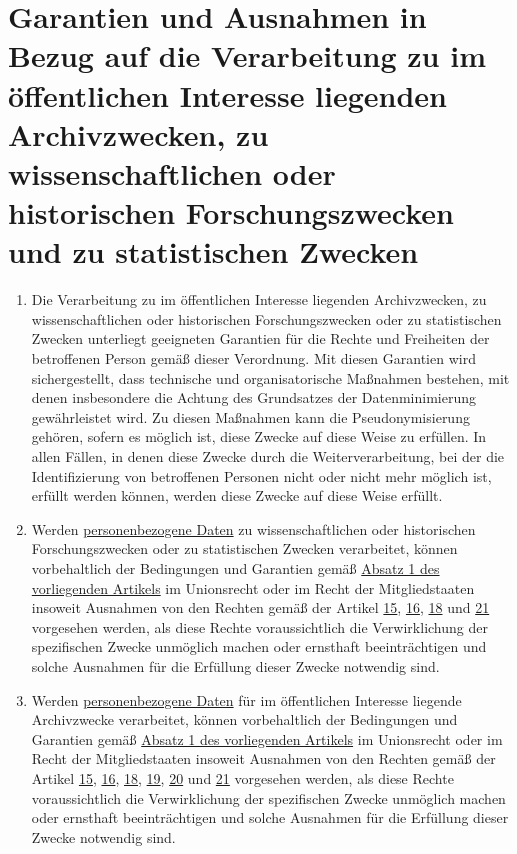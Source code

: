 \chapter{Garantien und Ausnahmen in Bezug auf die Verarbeitung zu im öffentlichen Interesse liegenden Archivzwecken, zu
 wissenschaftlichen oder historischen Forschungszwecken und zu statistischen Zwecken}
\label{ch:89}


\begin{enumerate}

  \item Die Verarbeitung zu im öffentlichen Interesse liegenden Archivzwecken, zu wissenschaftlichen oder historischen
   Forschungszwecken oder zu statistischen Zwecken unterliegt geeigneten Garantien für die Rechte und Freiheiten der
   betroffenen Person gemäß dieser Verordnung. Mit diesen Garantien wird sichergestellt, dass technische und
   organisatorische Maßnahmen bestehen, mit denen insbesondere die Achtung des Grundsatzes der Datenminimierung
   gewährleistet wird. Zu diesen Maßnahmen kann die Pseudonymisierung gehören, sofern es möglich ist, diese Zwecke auf
   diese Weise zu erfüllen. In allen Fällen, in denen diese Zwecke durch die Weiterverarbeitung, bei der die
   Identifizierung von betroffenen Personen nicht oder nicht mehr möglich ist, erfüllt werden können, werden diese
   Zwecke auf diese Weise erfüllt.
  \label{itm:89-1}

  \item Werden \hyperref[itm:04-1]{personenbezogene Daten} zu wissenschaftlichen oder historischen Forschungszwecken oder zu statistischen
   Zwecken verarbeitet, können vorbehaltlich der Bedingungen und Garantien gemäß \hyperref[itm:89-1]{Absatz 1 des
   vorliegenden Artikels} im Unionsrecht oder im Recht der Mitgliedstaaten insoweit Ausnahmen von den Rechten gemäß der
   Artikel \hyperref[ch:15]{15}, \hyperref[ch:16]{16}, \hyperref[ch:18]{18} und \hyperref[ch:21]{21} vorgesehen werden,
   als diese Rechte voraussichtlich die Verwirklichung der spezifischen Zwecke unmöglich machen oder ernsthaft
   beeinträchtigen und solche Ausnahmen für die Erfüllung dieser Zwecke notwendig sind.
  \label{itm:89-2}

  \item Werden \hyperref[itm:04-1]{personenbezogene Daten} für im öffentlichen Interesse liegende Archivzwecke verarbeitet, können
   vorbehaltlich der Bedingungen und Garantien gemäß \hyperref[itm:89-1]{Absatz 1 des vorliegenden Artikels} im
   Unionsrecht oder im Recht der Mitgliedstaaten insoweit Ausnahmen von den Rechten gemäß der Artikel \hyperref[ch:15]
   {15}, \hyperref[ch:16]{16}, \hyperref[ch:18]{18}, \hyperref[ch:19]{19}, \hyperref[ch:20]{20} und \hyperref[ch:21]
   {21} vorgesehen werden, als diese Rechte voraussichtlich die Verwirklichung der spezifischen Zwecke unmöglich machen
   oder ernsthaft beeinträchtigen und solche Ausnahmen für die Erfüllung dieser Zwecke notwendig sind.
  \label{itm:89-3}


\end{enumerate}
